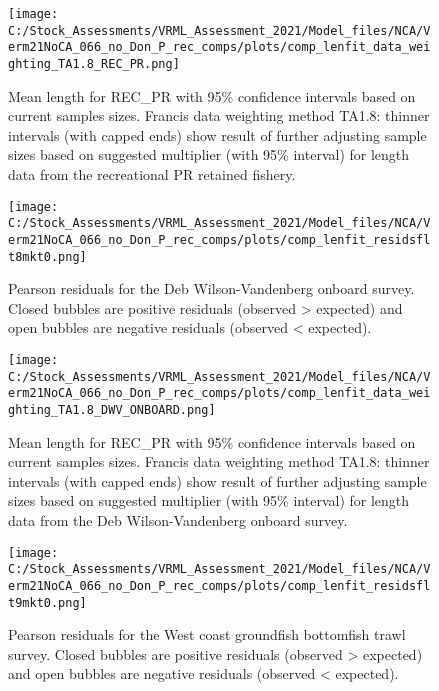\documentclass[11pt,
  english,
  a4paper,
]{article}
\begin{document}
\begin{figure}
\centering
\texttt{[image: C:/Stock\_Assessments/VRML\_Assessment\_2021/Model\_files/NCA/Verm21NoCA\_066\_no\_Don\_P\_rec\_comps/plots/comp\_lenfit\_data\_weighting\_TA1.8\_REC\_PR.png]}
\caption{Mean length for REC\_PR with 95\% confidence intervals based on current samples sizes. Francis data weighting method TA1.8: thinner intervals (with capped ends) show result of further adjusting sample sizes based on suggested multiplier (with 95\% interval) for length data from the recreational PR retained fishery.\label{fig:mean-len-fit-REC-PR}}
\end{figure}

\begin{figure}
\centering
\texttt{[image: C:/Stock\_Assessments/VRML\_Assessment\_2021/Model\_files/NCA/Verm21NoCA\_066\_no\_Don\_P\_rec\_comps/plots/comp\_lenfit\_residsflt8mkt0.png]}
\caption{Pearson residuals for the Deb Wilson-Vandenberg onboard survey. Closed bubbles are positive residuals (observed \textgreater{} expected) and open bubbles are negative residuals (observed \textless{} expected).\label{fig:len-pearson-DWV-ONBOARD}}
\end{figure}

\begin{figure}
\centering
\texttt{[image: C:/Stock\_Assessments/VRML\_Assessment\_2021/Model\_files/NCA/Verm21NoCA\_066\_no\_Don\_P\_rec\_comps/plots/comp\_lenfit\_data\_weighting\_TA1.8\_DWV\_ONBOARD.png]}
\caption{Mean length for REC\_PR with 95\% confidence intervals based on current samples sizes. Francis data weighting method TA1.8: thinner intervals (with capped ends) show result of further adjusting sample sizes based on suggested multiplier (with 95\% interval) for length data from the Deb Wilson-Vandenberg onboard survey.\label{fig:mean-len-fit-DWV-ONBOARD}}
\end{figure}

\begin{figure}
\centering
\texttt{[image: C:/Stock\_Assessments/VRML\_Assessment\_2021/Model\_files/NCA/Verm21NoCA\_066\_no\_Don\_P\_rec\_comps/plots/comp\_lenfit\_residsflt9mkt0.png]}
\caption{Pearson residuals for the West coast groundfish bottomfish trawl survey. Closed bubbles are positive residuals (observed \textgreater{} expected) and open bubbles are negative residuals (observed \textless{} expected).\label{fig:len-pearson-NWFSC-TWL}}
\end{figure}
\end{document}
